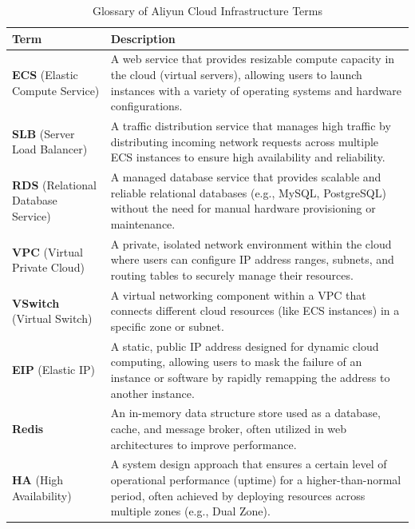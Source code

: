 \documentclass{article}
\theoremstyle{plain}
\theoremstyle{definition}
\theoremstyle{remark}
\begin{document}
\begin{table}[h]
    \centering
    \caption{Glossary of Aliyun Cloud Infrastructure Terms}
    \label{tab:aliyun_glossary}
    \renewcommand{\arraystretch}{1.2} %
    \begin{tabular}{l p{10cm}}
        \toprule
        \textbf{Term} & \textbf{Description} \\
        \midrule
        \textbf{ECS} (Elastic Compute Service) & A web service that provides resizable compute capacity in the cloud (virtual servers), allowing users to launch instances with a variety of operating systems and hardware configurations. \\
        
        \textbf{SLB} (Server Load Balancer) & A traffic distribution service that manages high traffic by distributing incoming network requests across multiple ECS instances to ensure high availability and reliability. \\
        
        \textbf{RDS} (Relational Database Service) & A managed database service that provides scalable and reliable relational databases (e.g., MySQL, PostgreSQL) without the need for manual hardware provisioning or maintenance. \\
        
        \textbf{VPC} (Virtual Private Cloud) & A private, isolated network environment within the cloud where users can configure IP address ranges, subnets, and routing tables to securely manage their resources. \\
        
        \textbf{VSwitch} (Virtual Switch) & A virtual networking component within a VPC that connects different cloud resources (like ECS instances) in a specific zone or subnet. \\
        
        \textbf{EIP} (Elastic IP) & A static, public IP address designed for dynamic cloud computing, allowing users to mask the failure of an instance or software by rapidly remapping the address to another instance. \\
        
        \textbf{Redis} & An in-memory data structure store used as a database, cache, and message broker, often utilized in web architectures to improve performance. \\
        
        \textbf{HA} (High Availability) & A system design approach that ensures a certain level of operational performance (uptime) for a higher-than-normal period, often achieved by deploying resources across multiple zones (e.g., Dual Zone). \\
        \bottomrule
    \end{tabular}
\end{table}
\end{document}
